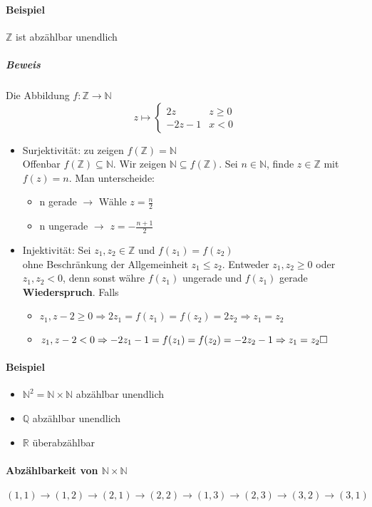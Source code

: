 \documentclass[a4paper]{scrartcl}
\begin{document}
\paragraph{Beispiel}
\label{sec-2-5-1-1}
$\mathbb{Z}$ ist abzählbar unendlich
\subparagraph{Beweis}
\label{sec-2-5-1-1-1}
Die Abbildung $f:\mathbb{Z}\to\mathbb{N}$
\[z\mapsto \begin{cases} 2z & z\geq 0\\ -2z - 1 & x < 0\end{cases}\]
\begin{itemize}
\item Surjektivität: zu zeigen $f(\mathbb{Z}) = \mathbb{N}$ \\
           Offenbar $f(\mathbb{Z}) \subseteq \mathbb{N}$. Wir zeigen $\mathbb{N} \subseteq f(\mathbb{Z})$. Sei $n\in\mathbb{N}$, finde $z\in\mathbb{Z}$ mit $f(z) = n$.
Man unterscheide:
\begin{itemize}
\item n gerade $\rightarrow$ Wähle $z=\frac{n}{2}$
\item n ungerade $\rightarrow$ $z=-\frac{n + 1}{2}$
\end{itemize}
\item Injektivität: Sei $z_1,z_2 \in\mathbb{Z}$ und $f(z_1) = f(z_2)$ \\
           ohne Beschränkung der Allgemeinheit $z_1 \leq z_2$. Entweder $z_1,z_2 \geq 0$ oder $z_1,z_2 < 0$, denn sonst währe $f(z_1)$ ungerade und $f(z_1)$ gerade \textbf{Wiederspruch}.
Falls
\begin{itemize}
\item $z_1,z-2 \geq 0 \Rightarrow 2z_1 = f(z_1) = f(z_2) = 2z_2 \Rightarrow z_1 = z_2$
\item $z_1,z-2 < 0 \Rightarrow -2z_1 -1 = f(z_1) = f(z_2) = -2z_2-1 \Rightarrow z_1 = z_2 \hfill\square$
\end{itemize}
\end{itemize}
\paragraph{Beispiel}
\label{sec-2-5-1-2}
\begin{itemize}
\item $\mathbb{N}^2 = \mathbb{N}\times\mathbb{N}$ abzählbar unendlich
\item $\mathbb{Q}$ abzählbar unendlich
\item $\mathbb{R}$ überabzählbar
\end{itemize}
\paragraph{Abzählbarkeit von $\mathbb{N}\times\mathbb{N}$}
\label{sec-2-5-1-3}
\[(1,1) \to (1,2) \to (2,1) \to (2,2) \to (1,3) \to (2,3) \to (3,2) \to (3,1)\]
\end{document}
